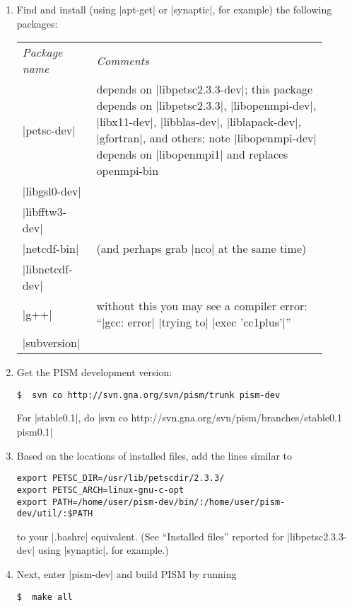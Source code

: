 \documentclass[11pt,final]{amsart}
\begin{document}
\begin{enumerate}
\item Find and install (using |apt-get| or |synaptic|, for example) the following packages:
  \begin{center}
    \begin{tabular*}{0.9\linewidth}{p{0.2\linewidth}p{0.7\linewidth}}
      \hline
      \emph{Package name} & \emph{Comments}\\
      |petsc-dev| & depends on |libpetsc2.3.3-dev|; this package 
      depends on |libpetsc2.3.3|, |libopenmpi-dev|, |libx11-dev|,
      |libblas-dev|, |liblapack-dev|, |gfortran|, and others; 
      note |libopenmpi-dev| depends on |libopenmpi1| and
      replaces openmpi-bin\\
      |libgsl0-dev| & \\
      |libfftw3-dev| & \\
      |netcdf-bin| & (and perhaps grab |nco| at the same time)\\
      |libnetcdf-dev| & \\
      |g++| & without this you may see a compiler error: ``|gcc: error| |trying to| |exec 'cc1plus'|''\\
      |subversion| & \\
      \hline
    \end{tabular*}
  \end{center}
\item Get the PISM development version:
\begin{verbatim}
$  svn co http://svn.gna.org/svn/pism/trunk pism-dev
\end{verbatim}
\noindent For |stable0.1|, do \quad\small |svn co http://svn.gna.org/svn/pism/branches/stable0.1 pism0.1|
\item Based on the locations of installed files, add the lines similar to
\begin{verbatim}
export PETSC_DIR=/usr/lib/petscdir/2.3.3/
export PETSC_ARCH=linux-gnu-c-opt
export PATH=/home/user/pism-dev/bin/:/home/user/pism-dev/util/:$PATH
\end{verbatim}
to your |.bashrc| equivalent.  (See ``Installed files'' reported for |libpetsc2.3.3-dev| using |synaptic|, for example.)
\item Next, enter |pism-dev| and build PISM by running
\begin{verbatim}
$  make all
\end{verbatim}
\end{enumerate}
\end{document}
